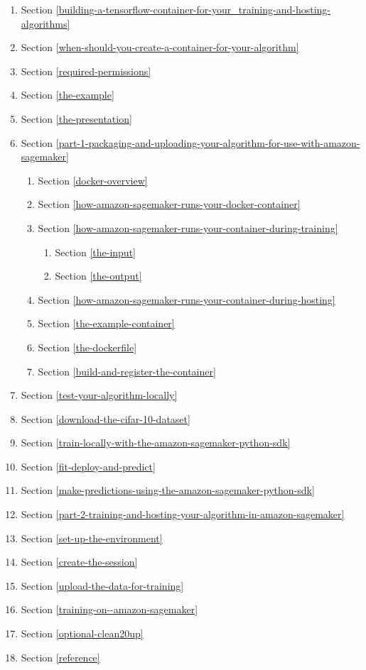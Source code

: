 \documentclass[11pt]{article}
\providecommand{\tightlist}{%
      \setlength{\itemsep}{0pt}\setlength{\parskip}{0pt}}
\begin{document}
\begin{enumerate}
\def\labelenumi{\arabic{enumi}.}
\tightlist
\item
  Section \ref{building-a-tensorflow-container-for-your_training-and-hosting-algorithms}
\item
  Section \ref{when-should-you-create-a-container-for-your-algorithm}
\item
  Section \ref{required-permissions}
\item
  Section \ref{the-example}
\item
  Section \ref{the-presentation}
\item
  Section \ref{part-1-packaging-and-uploading-your-algorithm-for-use-with-amazon-sagemaker}

  \begin{enumerate}
  \def\labelenumii{\arabic{enumii}.}
  \tightlist
  \item
    Section \ref{docker-overview}
  \item
    Section \ref{how-amazon-sagemaker-runs-your-docker-container}
  \item
    Section \ref{how-amazon-sagemaker-runs-your-container-during-training}

    \begin{enumerate}
    \def\labelenumiii{\arabic{enumiii}.}
    \tightlist
    \item
      Section \ref{the-input}
    \item
      Section \ref{the-output}
    \end{enumerate}
  \item
    Section \ref{how-amazon-sagemaker-runs-your-container-during-hosting}
  \item
    Section \ref{the-example-container}
  \item
    Section \ref{the-dockerfile}
  \item
    Section \ref{build-and-register-the-container}
  \end{enumerate}
\item
  Section \ref{test-your-algorithm-locally}
\item
  Section \ref{download-the-cifar-10-dataset}
\item
  Section \ref{train-locally-with-the-amazon-sagemaker-python-sdk}
\item
  Section \ref{fit-deploy-and-predict}
\item
  Section \ref{make-predictions-using-the-amazon-sagemaker-python-sdk}
\item
  Section \ref{part-2-training-and-hosting-your-algorithm-in-amazon-sagemaker}
\item
  Section \ref{set-up-the-environment}
\item
  Section \ref{create-the-session}
\item
  Section \ref{upload-the-data-for-training}
\item
  Section \ref{training-on--amazon-sagemaker}
\item
  Section \ref{optional-clean20up}\\
\item
  Section \ref{reference}
\end{enumerate}
\end{document}
